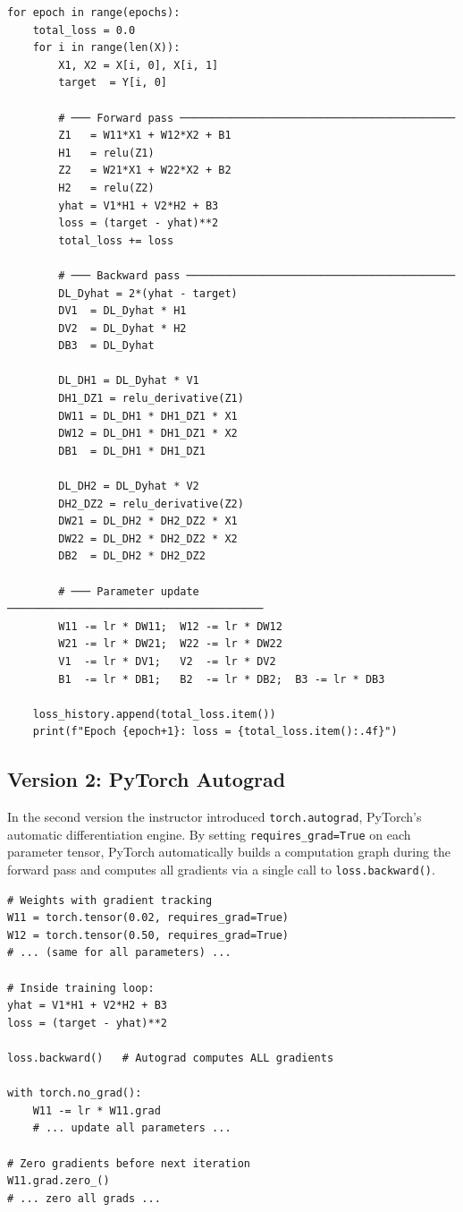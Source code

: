 \documentclass[12pt,a4paper]{article}
\begin{document}
\begin{verbatim}
for epoch in range(epochs):
    total_loss = 0.0
    for i in range(len(X)):
        X1, X2 = X[i, 0], X[i, 1]
        target  = Y[i, 0]

        # ─── Forward pass ───────────────────────────────────────────
        Z1   = W11*X1 + W12*X2 + B1
        H1   = relu(Z1)
        Z2   = W21*X1 + W22*X2 + B2
        H2   = relu(Z2)
        yhat = V1*H1 + V2*H2 + B3
        loss = (target - yhat)**2
        total_loss += loss

        # ─── Backward pass ──────────────────────────────────────────
        DL_Dyhat = 2*(yhat - target)
        DV1  = DL_Dyhat * H1
        DV2  = DL_Dyhat * H2
        DB3  = DL_Dyhat

        DL_DH1 = DL_Dyhat * V1
        DH1_DZ1 = relu_derivative(Z1)
        DW11 = DL_DH1 * DH1_DZ1 * X1
        DW12 = DL_DH1 * DH1_DZ1 * X2
        DB1  = DL_DH1 * DH1_DZ1

        DL_DH2 = DL_Dyhat * V2
        DH2_DZ2 = relu_derivative(Z2)
        DW21 = DL_DH2 * DH2_DZ2 * X1
        DW22 = DL_DH2 * DH2_DZ2 * X2
        DB2  = DL_DH2 * DH2_DZ2

        # ─── Parameter update ────────────────────────────────────────
        W11 -= lr * DW11;  W12 -= lr * DW12
        W21 -= lr * DW21;  W22 -= lr * DW22
        V1  -= lr * DV1;   V2  -= lr * DV2
        B1  -= lr * DB1;   B2  -= lr * DB2;  B3 -= lr * DB3

    loss_history.append(total_loss.item())
    print(f"Epoch {epoch+1}: loss = {total_loss.item():.4f}")
\end{verbatim}

\subsection{Version 2: PyTorch Autograd}
\label{sub:autograd}

In the second version the instructor introduced \texttt{torch.autograd},
PyTorch's automatic differentiation engine.  By setting
\texttt{requires\_grad=True} on each parameter tensor, PyTorch automatically
builds a computation graph during the forward pass and computes all gradients
via a single call to \texttt{loss.backward()}.

\begin{verbatim}
# Weights with gradient tracking
W11 = torch.tensor(0.02, requires_grad=True)
W12 = torch.tensor(0.50, requires_grad=True)
# ... (same for all parameters) ...

# Inside training loop:
yhat = V1*H1 + V2*H2 + B3
loss = (target - yhat)**2

loss.backward()   # Autograd computes ALL gradients

with torch.no_grad():
    W11 -= lr * W11.grad
    # ... update all parameters ...

# Zero gradients before next iteration
W11.grad.zero_()
# ... zero all grads ...
\end{verbatim}
\end{document}
